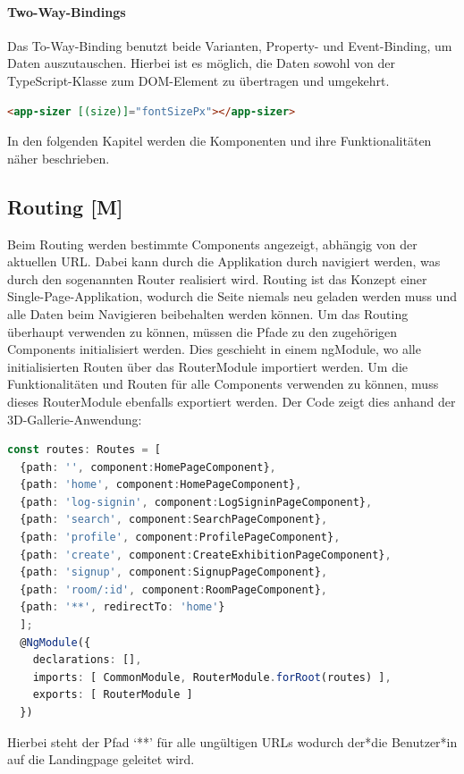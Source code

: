 \paragraph{Two-Way-Bindings}
Das To-Way-Binding benutzt beide Varianten, Property- und Event-Binding, um Daten auszutauschen. Hierbei ist es möglich, die Daten sowohl von der TypeScript-Klasse zum DOM-Element zu übertragen und umgekehrt. \cite{AngularTwoWayBinding}
\begin{lstlisting}[caption={{Beispiel für Two-Way-Bindings \cite{AngularTwoWayBinding}}},language=HTML,label=lst:impl:two-way-bindings]
    <app-sizer [(size)]="fontSizePx"></app-sizer>
\end{lstlisting}
In den folgenden Kapitel werden die Komponenten und ihre Funktionalitäten näher beschrieben. 

\subsection{Routing [M]}\label{sec:Routing}
Beim Routing werden bestimmte Components angezeigt, abhängig von der aktuellen URL. Dabei kann durch die Applikation durch navigiert werden, was durch den sogenannten Router realisiert wird. Routing ist das Konzept einer Single-Page-Applikation, wodurch die Seite niemals neu geladen werden muss und alle Daten beim Navigieren beibehalten werden können. Um das Routing überhaupt verwenden zu können, müssen die Pfade zu den zugehörigen Components initialisiert werden. Dies geschieht in einem ngModule, wo alle initialisierten Routen über das RouterModule importiert werden. Um die Funktionalitäten und Routen für alle Components verwenden zu können, muss dieses RouterModule ebenfalls exportiert werden. Der Code zeigt dies anhand der 3D-Gallerie-Anwendung:
\begin{lstlisting}[caption={Routing in der 3D-Gallery},language=TypeScript,label=lst:impl:routing]
const routes: Routes = [
  {path: '', component:HomePageComponent},
  {path: 'home', component:HomePageComponent},
  {path: 'log-signin', component:LogSigninPageComponent},
  {path: 'search', component:SearchPageComponent},
  {path: 'profile', component:ProfilePageComponent},
  {path: 'create', component:CreateExhibitionPageComponent},
  {path: 'signup', component:SignupPageComponent},
  {path: 'room/:id', component:RoomPageComponent},
  {path: '**', redirectTo: 'home'}
  ];
  @NgModule({
    declarations: [],
    imports: [ CommonModule, RouterModule.forRoot(routes) ],
    exports: [ RouterModule ]
  })

\end{lstlisting}
Hierbei steht der Pfad ‘**’ für alle ungültigen URLs wodurch der*die Benutzer*in auf die Landingpage geleitet wird.


